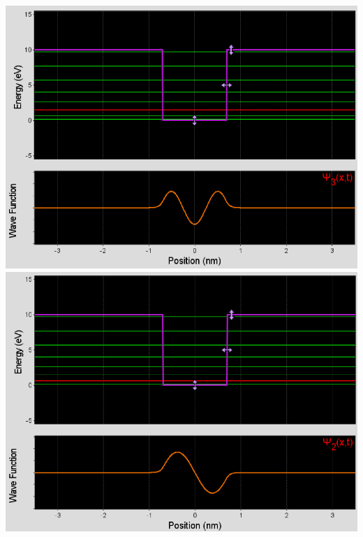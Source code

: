 \documentclass[11pt]{book}
\theoremstyle{break}
\theoremstyle{break}
\begin{document}
\begin{center}
\includegraphics[scale=0.38]{1a}
\includegraphics[scale=0.38]{1b}
\end{center}
\hfill\break
\end{document}
